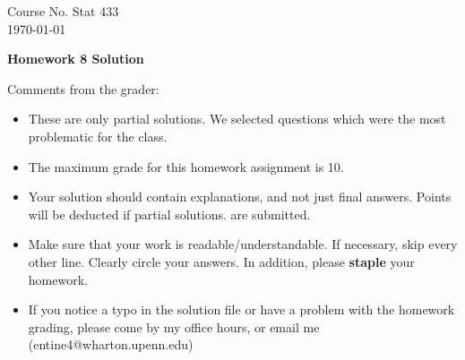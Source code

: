\documentclass[10pt,a4paper]{article}
\begin{document}
\begin{flushleft}
Course No. Stat 433 \\
\today
\end{flushleft}

\begin{center}
{\Large{\bf  Homework 8 Solution}}
\end{center}

\textcolor[rgb]{0.98,0.00,0.00}{Comments from the grader:}
\begin{itemize}
    \item \textcolor[rgb]{0.98,0.00,0.00}{These are only partial solutions.  We selected
    questions which were the most problematic for the class.}
    \item \textcolor[rgb]{0.98,0.00,0.00}{The maximum grade for this homework assignment is 10.}
    \item \textcolor[rgb]{0.98,0.00,0.00}{Your solution should contain explanations, and not just
    final answers. Points will be deducted if partial solutions.
    are submitted.}
    \item \textcolor[rgb]{0.98,0.00,0.00}{Make sure that your work is readable/understandable.  If necessary, skip every other line.  Clearly circle your answers.  In addition, please {\bf staple} your homework.}
    \item \textcolor[rgb]{0.98,0.00,0.00}{If you notice a typo in the solution file or have a problem with the homework
    grading, please come by my office hours, or email me (entine4@wharton.upenn.edu)}

\end{itemize}
\end{document}
